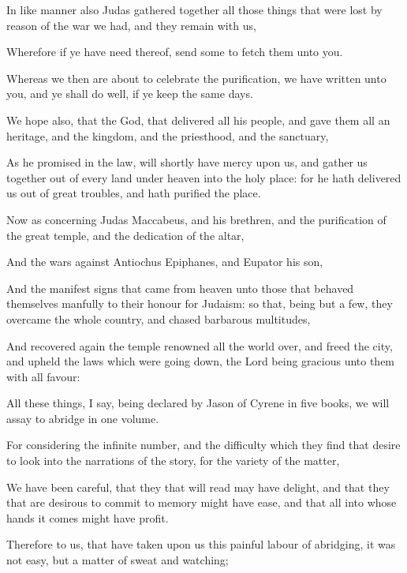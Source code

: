 {\par }{\PP {}In like manner also Judas gathered together all those things that were lost by reason of the war we had, and they remain with us,
\par }{\PP {}Wherefore if ye have need thereof, send some to fetch them unto you.
\par }{\PP {}Whereas we then are about to celebrate the purification, we have written unto you, and ye shall do well, if ye keep the same days.
\par }{\PP {}We hope also, that the God, that delivered all his people, and gave them all an heritage, and the kingdom, and the priesthood, and the sanctuary,
\par }{\PP {}As he promised in the law, will shortly have mercy upon us, and gather us together out of every land under heaven into the holy place: for he hath delivered us out of great troubles, and hath purified the place.
\par }{\PP {}Now as concerning Judas Maccabeus, and his brethren, and the purification of the great temple, and the dedication of the altar,
\par }{\PP {}And the wars against Antiochus Epiphanes, and Eupator his son,
\par }{\PP {}And the manifest signs that came from heaven unto those that behaved themselves manfully to their honour for Judaism: so that, being but a few, they overcame the whole country, and chased barbarous multitudes,
\par }{\PP {}And recovered again the temple renowned all the world over, and freed the city, and upheld the laws which were going down, the Lord being gracious unto them with all favour:
\par }{\PP {}All these things, I say, being declared by Jason of Cyrene in five books, we will assay to abridge in one volume.
\par }{\PP {}For considering the infinite number, and the difficulty which they find that desire to look into the narrations of the story, for the variety of the matter,
\par }{\PP {}We have been careful, that they that will read may have delight, and that they that are desirous to commit to memory might have ease, and that all into whose hands it comes might have profit.
\par }{\PP {}Therefore to us, that have taken upon us this painful labour of abridging, it was not easy, but a matter of sweat and watching;
}
